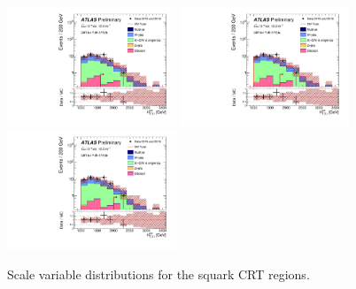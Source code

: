 \begin{figure}[tbp]
\begin{center}
\includegraphics[width=0.45\textwidth]{figures/ATLAS-CONF-2016-078_INT/N-1Plots/AtlasStyle/Preliminary/CRT_SRJigsawSRS2b_LastCut_CRT_minusone}
\includegraphics[width=0.45\textwidth]{figures/ATLAS-CONF-2016-078_INT/N-1Plots/AtlasStyle/Preliminary/CRT_SRJigsawSRS3a_LastCut_CRT_minusone}
\includegraphics[width=0.45\textwidth]{figures/ATLAS-CONF-2016-078_INT/N-1Plots/AtlasStyle/Preliminary/CRT_SRJigsawSRS3b_LastCut_CRT_minusone}
\end{center}
\caption{Scale variable distributions for the squark CRT regions.}
\label{fig:CRT_SRJigsawSRS1a_LastCut_CRT_minusone}
\end{figure}

\clearpage

